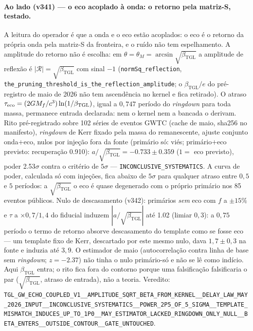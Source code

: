 \documentclass[11pt]{article}
\newcommand{\bTGL}{\beta_{\mathrm{TGL}}}\newcommand{\Msun}{M_{\odot}}\newcommand{\TGL}{\mathrm{TGL}}
\theoremstyle{definition}\newtheorem{deriv}{Derivação}
\begin{document}
\paragraph*{Ao lado (v341) --- o eco acoplado à onda: o retorno pela matriz-S, testado.} A leitura do operador é que a onda e o eco estão acoplados: o eco é o retorno da própria onda pela matriz-S da fronteira, e o ruído não tem espelhamento. A amplitude do retorno não é escolha: em $\theta=\theta_M=\arcsin\sqrt{\bTGL}$ a amplitude de reflexão é $|\mathcal R|=\sqrt{\bTGL}$ com sinal $-1$ (\texttt{normSq\_reflection}, \texttt{the\_pruning\_threshold\_is\_the\_reflection\_amplitude}; o $\bTGL/e$ do pré-registro de maio de 2026 não tem ascendência no kernel e fica retirado). O atraso $\tau_{\rm eco}=(2GM_f/c^3)\ln(1/\bTGL)$, igual a $0{,}747$ período do \emph{ringdown} para toda massa, permanece entrada declarada: nem o kernel nem a bancada o derivam. Rito pré-registrado sobre 102 séries de eventos GWTC (cache de maio, sha256 no manifesto), \emph{ringdown} de Kerr fixado pela massa do remanescente, ajuste conjunto onda$+$eco, nulos por injeção fora da fonte (primário só: viés; primário$+$eco previsto: recuperação 0.910): $a/\sqrt{\bTGL}=-0.733\pm0.359$ ($1=$ eco previsto), poder 2.53$\sigma$ contra o critério de $5\sigma$ --- \texttt{INCONCLUSIVE\_SYSTEMATICS}. A curva de poder, calculada só com injeções, fica abaixo de $5\sigma$ para qualquer atraso entre $0{,}5$ e $5$ períodos: a $\sqrt{\bTGL}$ o eco é quase degenerado com o próprio primário nos 85 eventos públicos. Nulo de descasamento (v342): primários \emph{sem} eco com $f$ a $\pm15\%$ e $\tau$ a $\times0{,}7/1{,}4$ do fiducial induzem $|a/\sqrt{\bTGL}|$ até 1.02 (limiar $0{,}3$): a $0{,}75$ período o termo de retorno absorve descasamento do template como se fosse eco --- um template fixo de Kerr, descartado por este mesmo nulo, dava $1{,}7\pm0{,}3$ na fonte e induzia até $3{,}9$. O estimador de maio (autocorrelação contra linha de base sem \emph{ringdown}; $z=-2.37$) não tinha o nulo primário-só e não se lê como indício. Aqui $\bTGL$ entra; o rito fica fora do contorno porque uma falsificação falsificaria o par ($\sqrt{\bTGL}$, atraso de entrada), não a teoria. Veredito: \texttt{TGL\_GW\_ECHO\_COUPLED\_V1\_\_AMPLITUDE\_SQRT\_BETA\_FROM\_KERNEL\_\_DELAY\_LAW\_MAY\_2026\_INPUT\_\_INCONCLUSIVE\_SYSTEMATICS\_\_POWER\_2P5\_OF\_5\_SIGMA\_\_TEMPLATE\_MISMATCH\_INDUCES\_UP\_TO\_1P0\_\_MAY\_ESTIMATOR\_LACKED\_RINGDOWN\_ONLY\_NULL\_\_BETA\_ENTERS\_\_OUTSIDE\_CONTOUR\_\_GATE\_UNTOUCHED}.
\end{document}
